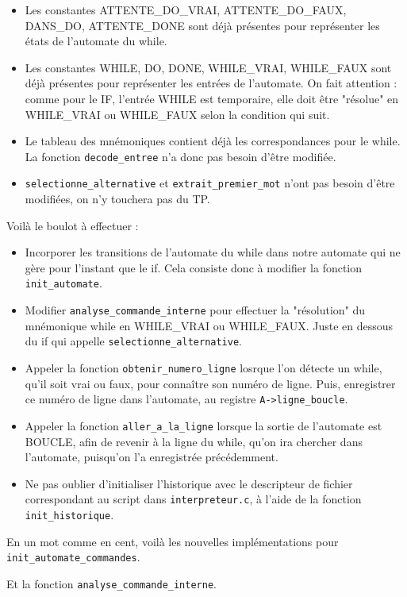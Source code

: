 \documentclass[10pt]{article}
\begin{document}
\begin{enumerate}[label=\textbf{[\alph*]}]
  \begin{itemize}
  \item Les constantes ATTENTE\_DO\_VRAI, ATTENTE\_DO\_FAUX, DANS\_DO,
    ATTENTE\_DONE sont déjà présentes pour représenter les états de
    l'automate du while.
  \item Les constantes WHILE, DO, DONE, WHILE\_VRAI, WHILE\_FAUX sont
    déjà présentes pour représenter les entrées de l'automate. On fait
    attention : comme pour le IF, l'entrée WHILE est temporaire, elle
    doit être "résolue" en WHILE\_VRAI ou WHILE\_FAUX selon la condition
    qui suit.
  \item Le tableau des mnémoniques contient déjà les correspondances
    pour le while. La fonction \texttt{decode\_entree} n'a donc pas
    besoin d'être modifiée.
  \item \texttt{selectionne\_alternative} et
    \texttt{extrait\_premier\_mot} n'ont pas besoin d'être modifiées,
    on n'y touchera pas du TP.

  \end{itemize}

  Voilà le boulot à effectuer :

  \begin{itemize}
  \item Incorporer les transitions de l'automate du while dans notre
    automate qui ne gère pour l'instant que le if. Cela consiste donc
    à modifier la fonction \texttt{init\_automate}.
  \item Modifier \texttt{analyse\_commande\_interne} pour effectuer la
    "résolution" du mnémonique while en WHILE\_VRAI ou
    WHILE\_FAUX. Juste en dessous du if qui appelle
    \texttt{selectionne\_alternative}.
  \item Appeler la fonction \texttt{obtenir\_numero\_ligne} losrque
    l'on détecte un while, qu'il soit vrai ou faux, pour connaître son
    numéro de ligne. Puis, enregistrer ce numéro de ligne dans
    l'automate, au registre \texttt{A->ligne\_boucle}.
  \item Appeler la fonction \texttt{aller\_a\_la\_ligne} lorsque la
    sortie de l'automate est BOUCLE, afin de revenir à la ligne du
    while, qu'on ira chercher dans l'automate, puisqu'on l'a
    enregistrée précédemment.
  \item Ne pas oublier d'initialiser l'historique avec le descripteur
    de fichier correspondant au script dans \texttt{interpreteur.c}, à
    l'aide de la fonction \texttt{init\_historique}.
  \end{itemize}

  En un mot comme en cent, voilà les nouvelles implémentations pour
  \texttt{init\_automate\_commandes}.

  

  \vspace{0.2cm}
  Et la fonction \texttt{analyse\_commande\_interne}.

  

\end{enumerate}
\end{document}
